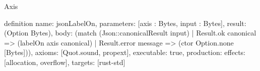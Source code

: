 \begin{lexlean}{Axis}
\begin{semanticmodule}
definition{
  name: jsonLabelOn,
  parameters: [axis : Bytes, input : Bytes],
  result: (Option Bytes),
  body: (match (Json::canonicalResult input)
    | Result.ok canonical => (labelOn axis canonical)
    | Result.error message => (ctor Option.none [Bytes])),
  axioms: [Quot.sound, propext],
  executable: true,
  production: {effects: [allocation, overflow], targets: [rust-std]}
}
\end{semanticmodule}
\end{lexlean}
